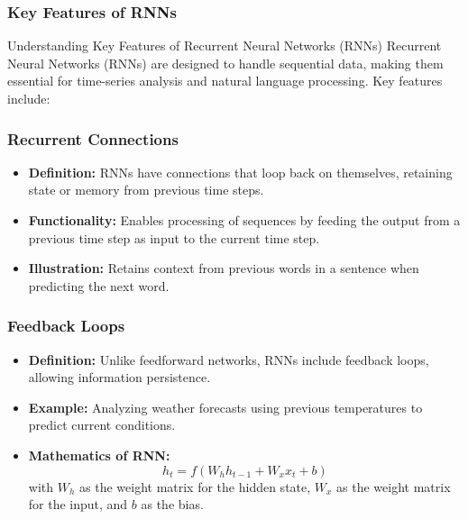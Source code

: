 \documentclass[aspectratio=169]{beamer}
\begin{document}
\begin{frame}[fragile]
    \frametitle{Key Features of RNNs}
    \begin{block}{Understanding Key Features of Recurrent Neural Networks (RNNs)}
        Recurrent Neural Networks (RNNs) are designed to handle sequential data, making them essential for time-series analysis and natural language processing. Key features include:
    \end{block}
\end{frame}

\begin{frame}[fragile]
    \frametitle{Recurrent Connections}
    \begin{itemize}
        \item \textbf{Definition:} RNNs have connections that loop back on themselves, retaining state or memory from previous time steps.
        \item \textbf{Functionality:} Enables processing of sequences by feeding the output from a previous time step as input to the current time step.
        \item \textbf{Illustration:} Retains context from previous words in a sentence when predicting the next word.
    \end{itemize}
\end{frame}

\begin{frame}[fragile]
    \frametitle{Feedback Loops}
    \begin{itemize}
        \item \textbf{Definition:} Unlike feedforward networks, RNNs include feedback loops, allowing information persistence.
        \item \textbf{Example:} Analyzing weather forecasts using previous temperatures to predict current conditions.
        \item \textbf{Mathematics of RNN:}
        \begin{equation}
            h_t = f(W_h h_{t-1} + W_x x_t + b)
        \end{equation}
        with \( W_h \) as the weight matrix for the hidden state, \( W_x \) as the weight matrix for the input, and \( b \) as the bias.
    \end{itemize}
\end{frame}
\end{document}
